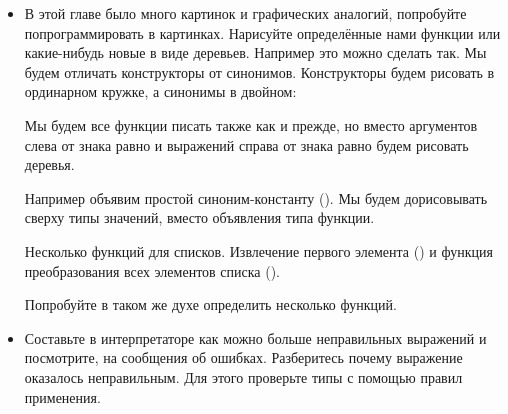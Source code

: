 \begin{itemize}


\item В этой главе было много картинок и графических аналогий, 
попробуйте попрограммировать в картинках. Нарисуйте 
определённые нами функции или какие-нибудь новые в
виде деревьев. Например это можно сделать так.
Мы будем отличать конструкторы от синонимов. Конструкторы
будем рисовать в ординарном кружке, а синонимы в двойном:


Мы будем все функции писать также как и прежде, но 
вместо аргументов слева от знака равно и выражений
справа от знака равно будем рисовать деревья. 

Например объявим простой синоним-константу ().
Мы будем дорисовывать сверху типы значений, вместо объявления типа
функции.


Несколько функций для списков. Извлечение первого элемента 
() и функция преобразования всех элементов списка 
().



Попробуйте в таком же духе определить несколько функций.


\item Составьте в интерпретаторе как можно больше
    неправильных выражений и посмотрите, на сообщения об ошибках.
    Разберитесь почему выражение оказалось неправильным.
    Для этого проверьте типы с помощью правил применения.

\end{itemize}


